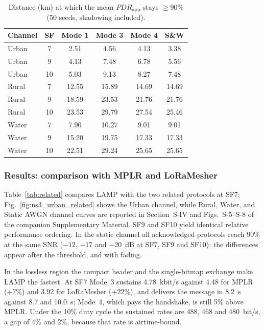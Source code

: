\documentclass[journal]{IEEEtran}
\begin{document}
\begin{table}[htpb]
\centering
\caption{Distance (km) at which the mean $PDR_{\mathrm{app}}$ stays $\ge 90\%$ (50 seeds, shadowing included).}
\label{tab:range}
\renewcommand{\arraystretch}{1.0}
\footnotesize
\begin{tabular}{|l|c|c|c|c|c|}
\hline
\textbf{Channel} & \textbf{SF} & \textbf{Mode 1} & \textbf{Mode 3} & \textbf{Mode 4} & \textbf{S\&W} \\ \hline
Urban & 7  & 2.51 & 4.56 & 4.13 & 3.38 \\ \hline
Urban & 9  & 4.13 & 7.48 & 6.78 & 5.56 \\ \hline
Urban & 10 & 5.03 & 9.13 & 8.27 & 7.48 \\ \hline
Rural & 7  & 12.55 & 15.89 & 14.69 & 14.69 \\ \hline
Rural & 9  & 18.59 & 23.53 & 21.76 & 21.76 \\ \hline
Rural & 10 & 23.53 & 29.79 & 27.54 & 25.46 \\ \hline
Water & 7  & 7.90 & 10.27 & 9.01 & 9.01 \\ \hline
Water & 9  & 15.20 & 19.75 & 17.33 & 17.33 \\ \hline
Water & 10 & 22.51 & 29.24 & 25.65 & 25.65 \\ \hline
\end{tabular}
\end{table}

\subsubsection{Results: comparison with MPLR and LoRaMesher}
\label{sec:related_results}
Table~\ref{tab:related} compares \ac{LAMP} with the two related protocols at SF7; Fig.~\ref{fig:ns3_urban_related} shows the Urban channel, while Rural, Water, and Static AWGN channel curves are reported in Section~S-IV and Figs.~S-5--S-8 of the companion Supplementary Material. SF9 and SF10 yield identical relative performance ordering. In the static channel all acknowledged protocols reach 90\% at the same SNR ($-12$, $-17$ and $-20$~dB at SF7, SF9 and SF10): the differences appear after the threshold, and with fading.

In the lossless region the compact header and the single-bitmap exchange make \ac{LAMP} the fastest. At SF7 Mode~3 sustains 4.78~kbit/s against 4.48 for MPLR (+7\%) and 3.92 for LoRaMesher (+22\%), and delivers the message in 8.2~s against 8.7 and 10.0~s; Mode~4, which pays the handshake, is still 5\% above MPLR. Under the 10\% duty cycle the sustained rates are 488, 468 and 480~bit/s, a gap of 4\% and 2\%, because that rate is airtime-bound.
\end{document}
